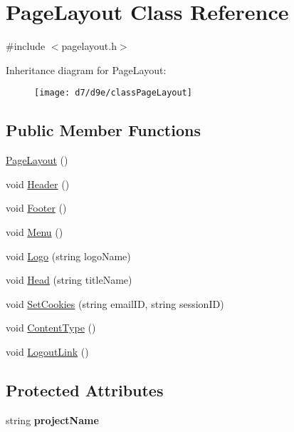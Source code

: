 \hypertarget{classPageLayout}{\section{\-Page\-Layout \-Class \-Reference}
\label{d7/d9e/classPageLayout}
}


{\ttfamily \#include $<$pagelayout.\-h$>$}

\-Inheritance diagram for \-Page\-Layout\-:\begin{figure}[H]
\begin{center}
\leavevmode
\texttt{[image: d7/d9e/classPageLayout]}
\end{center}
\end{figure}
\subsection*{\-Public \-Member \-Functions}
\begin{DoxyCompactItemize}
\item 
\hyperlink{classPageLayout_ab3f470f006f9820610d9aaebe5b8427b}{\-Page\-Layout} ()
\item 
void \hyperlink{classPageLayout_a7726061f0653245f644a05807fa92472}{\-Header} ()
\item 
void \hyperlink{classPageLayout_a68aa868a8868b12964f161838b5f814c}{\-Footer} ()
\item 
void \hyperlink{classPageLayout_a49af1dca286bbee9432192a7b3c00332}{\-Menu} ()
\item 
void \hyperlink{classPageLayout_ae60235c6af48e3ebbc6343d02456da0c}{\-Logo} (string logo\-Name)
\item 
void \hyperlink{classPageLayout_ae50907d56f0ba7a85f7ccfdeafa45bcc}{\-Head} (string title\-Name)
\item 
void \hyperlink{classPageLayout_a449b4dde24cf3dc10299dc3c7bfc0e9c}{\-Set\-Cookies} (string email\-I\-D, string session\-I\-D)
\item 
void \hyperlink{classPageLayout_af1d13a4aa259cf62ccf92549b696de32}{\-Content\-Type} ()
\item 
void \hyperlink{classPageLayout_abe2cfa43480c1b48125b3d618cab7831}{\-Logout\-Link} ()
\end{DoxyCompactItemize}
\subsection*{\-Protected \-Attributes}
\begin{DoxyCompactItemize}
\item 
\hypertarget{classPageLayout_a8a3c1ddc422df2556fbc95d0cd575a05}{string {\bfseries project\-Name}}\label{d7/d9e/classPageLayout_a8a3c1ddc422df2556fbc95d0cd575a05}

\end{DoxyCompactItemize}


